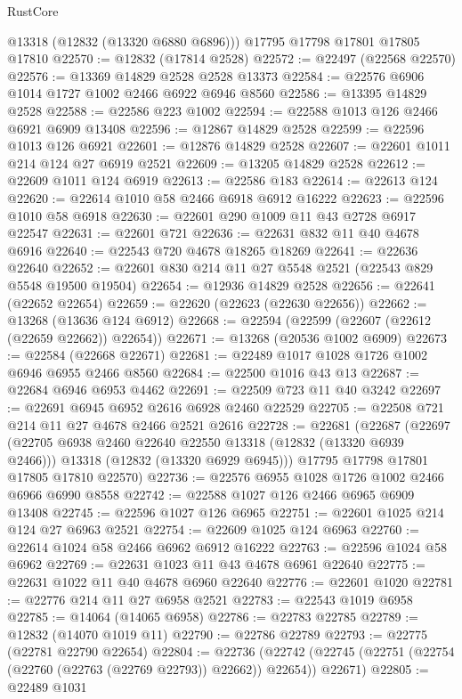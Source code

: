 \begin{lexlean}{RustCore}
\begin{coremodule}
      @13318
      (@12832 (@13320 @6880 @6896)))
    @17795
    @17798
    @17801
    @17805
    @17810
@22570 := @12832 (@17814 @2528)
@22572 := @22497 (@22568 @22570)
@22576 := @13369 @14829 @2528 @2528 @13373
@22584 := @22576 @6906 @1014 @1727 @1002 @2466 @6922 @6946 @8560
@22586 := @13395 @14829 @2528
@22588 := @22586 @223 @1002
@22594 := @22588 @1013 @126 @2466 @6921 @6909 @13408
@22596 := @12867 @14829 @2528
@22599 := @22596 @1013 @126 @6921
@22601 := @12876 @14829 @2528
@22607 := @22601 @1011 @214 @124 @27 @6919 @2521
@22609 := @13205 @14829 @2528
@22612 := @22609 @1011 @124 @6919
@22613 := @22586 @183
@22614 := @22613 @124
@22620 := @22614 @1010 @58 @2466 @6918 @6912 @16222
@22623 := @22596 @1010 @58 @6918
@22630 := @22601 @290 @1009 @11 @43 @2728 @6917 @22547
@22631 := @22601 @721
@22636 := @22631 @832 @11 @40 @4678 @6916
@22640 := @22543 @720 @4678 @18265 @18269
@22641 := @22636 @22640
@22652 := @22601 @830 @214 @11 @27 @5548 @2521 (@22543 @829 @5548 @19500 @19504)
@22654 := @12936 @14829 @2528
@22656 := @22641 (@22652 @22654)
@22659 := @22620 (@22623 (@22630 @22656))
@22662 := @13268 (@13636 @124 @6912)
@22668 := @22594 (@22599 (@22607 (@22612 (@22659 @22662)) @22654))
@22671 := @13268 (@20536 @1002 @6909)
@22673 := @22584 (@22668 @22671)
@22681 := @22489 @1017 @1028 @1726 @1002 @6946 @6955 @2466 @8560
@22684 := @22500 @1016 @43 @13
@22687 := @22684 @6946 @6953 @4462
@22691 := @22509 @723 @11 @40 @3242
@22697 := @22691 @6945 @6952 @2616 @6928 @2460 @22529
@22705 := @22508 @721 @214 @11 @27 @4678 @2466 @2521 @2616
@22728 := @22681
    (@22687
      (@22697
        (@22705 @6938 @2460 @22640 @22550 @13318 (@12832 (@13320 @6939 @2466)))
        @13318
        (@12832 (@13320 @6929 @6945)))
      @17795
      @17798
      @17801
      @17805
      @17810
      @22570)
@22736 := @22576 @6955 @1028 @1726 @1002 @2466 @6966 @6990 @8558
@22742 := @22588 @1027 @126 @2466 @6965 @6909 @13408
@22745 := @22596 @1027 @126 @6965
@22751 := @22601 @1025 @214 @124 @27 @6963 @2521
@22754 := @22609 @1025 @124 @6963
@22760 := @22614 @1024 @58 @2466 @6962 @6912 @16222
@22763 := @22596 @1024 @58 @6962
@22769 := @22631 @1023 @11 @43 @4678 @6961 @22640
@22775 := @22631 @1022 @11 @40 @4678 @6960 @22640
@22776 := @22601 @1020
@22781 := @22776 @214 @11 @27 @6958 @2521
@22783 := @22543 @1019 @6958
@22785 := @14064 (@14065 @6958)
@22786 := @22783 @22785
@22789 := @12832 (@14070 @1019 @11)
@22790 := @22786 @22789
@22793 := @22775 (@22781 @22790 @22654)
@22804 := @22736
    (@22742 (@22745 (@22751 (@22754 (@22760 (@22763 (@22769 @22793)) @22662)) @22654)) @22671)
@22805 := @22489 @1031

\end{coremodule}
\end{lexlean}
